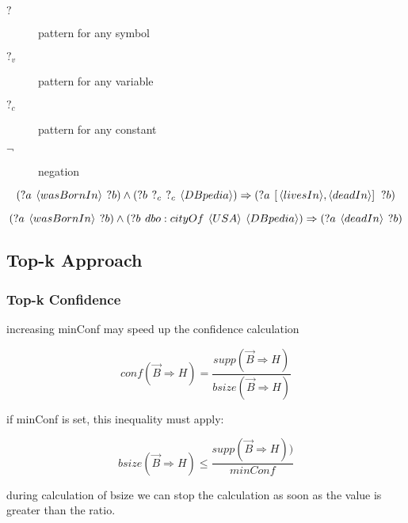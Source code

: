 \begin{description}
\item[$?$] pattern for any symbol
\item[$?_{v}$] pattern for any variable
\item[$?_{c}$] pattern for any constant
\item[$\neg$] negation
\end{description}

$$(?a\hspace{0.4em}\langle wasBornIn \rangle\hspace{0.4em}?b) \land (?b\hspace{0.4em}?_{c}\hspace{0.4em}?_{c} \hspace{0.4em} \langle DBpedia \rangle) \Rightarrow (?a\hspace{0.4em}[ \,\langle livesIn \rangle,\langle deadIn \rangle	] \,\hspace{0.4em}?b)$$

$$(?a\hspace{0.4em}\langle wasBornIn \rangle\hspace{0.4em}?b) \land (?b\hspace{0.4em}dbo:cityOf\hspace{0.4em}\langle USA \rangle \hspace{0.4em} \langle DBpedia \rangle) \Rightarrow (?a\hspace{0.4em} \langle deadIn \rangle\hspace{0.4em}?b)$$

\subsection{Top-k Approach}


\subsubsection{Top-k Confidence}

increasing minConf may speed up the confidence calculation

$$conf(\vec{B}\Rightarrow H) = \frac{supp(\vec{B}\Rightarrow H)}{bsize(\vec{B}\Rightarrow H)} $$

if minConf is set, this inequality must apply:

$$bsize(\vec{B}\Rightarrow H) \leq \frac{supp(\vec{B} \Rightarrow H))}{minConf} $$

during calculation of bsize we can stop the calculation as soon as the value is greater than the ratio.

